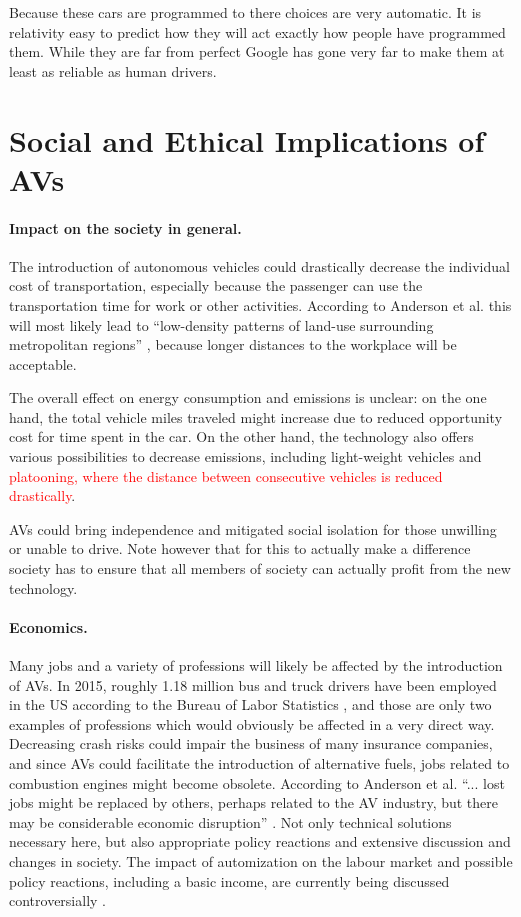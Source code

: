 \documentclass[11pt]{article}
\newcommand{\changed}[1]{\textcolor{red}{#1}}
\begin{document}
Because these cars are programmed to there choices are very automatic. It is relativity easy to predict how they will act
exactly how people have programmed them. While they are far from perfect Google has gone very far to make them at least as
reliable as human drivers. 

\section{Social and Ethical Implications of AVs}
\paragraph{Impact on the society in general.}
The introduction of autonomous vehicles could drastically decrease the individual cost of transportation, especially because the passenger can use the transportation time for work or other activities. According to Anderson et al. this will most likely lead to ``low-density patterns of land-use surrounding metropolitan regions'' \cite{Anderson2014rand}, because longer distances to the workplace will be acceptable.

The overall effect on energy consumption and emissions is unclear: on the one hand, the total vehicle miles traveled might increase due to reduced opportunity cost for time spent in the car. On the other hand, the technology also offers various possibilities to decrease emissions, including light-weight vehicles and \changed{platooning, where the distance between consecutive vehicles is reduced drastically}.

AVs could bring independence and mitigated social isolation for those unwilling or unable to drive. Note however that for this to actually make a difference society has to ensure that all members of society can actually profit from the new technology.

\paragraph{Economics.}
Many jobs and a variety of professions will likely be affected by the introduction of AVs. In 2015, roughly 1.18 million bus and truck drivers have been employed in the US according to the Bureau of Labor Statistics \cite{USLabourBureau2016}, and those are only two examples of professions which would obviously be affected in a very direct way. Decreasing crash risks could impair the business of many insurance companies, and since AVs could facilitate the introduction of alternative fuels, jobs related to combustion engines might become obsolete. According to Anderson et al. ``... lost jobs might be replaced by others, perhaps related to the AV industry, but there may be considerable economic disruption'' \cite[p. 40ff]{Anderson2014rand}. Not only technical solutions necessary here, but also appropriate policy reactions and extensive discussion and changes in society. The impact of automization on the labour market and possible policy reactions, including a basic income, are currently being discussed controversially \cite{VanDerVeen2002, Olsen2014}.
\end{document}

